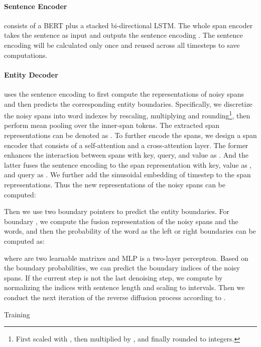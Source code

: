 \documentclass[11pt]{article}
\begin{document}
\paragraph{Sentence Encoder} consists of a BERT \citep{devlin-etal-2019-bert} plus a stacked bi-directional LSTM. The whole span encoder takes the sentence  as input and outputs the sentence encoding . The sentence encoding  will be calculated only once and reused across all timesteps to save computations.




\paragraph{Entity Decoder} uses the sentence encoding  to first compute the representations of  noisy spans  and then predicts the corresponding entity boundaries.
Specifically, we discretize the noisy spans into word indexes by rescaling, multiplying and rounding\footnote{\;First scaled with , then multiplied by , and finally rounded to integers.}, then perform mean pooling over the inner-span tokens. The extracted span representations can be denoted as . 
To further encode the spans, we design a span encoder that consists of a self-attention and a cross-attention layer. The former enhances the interaction between spans with key, query, and value as .  And the latter fuses the sentence encoding to the span representation with key, value as , and query as . 
We further add the sinusoidal embedding  \citep{NIPS2017_3f5ee243} of timestep  to the span representations. 
Thus the new representations  of the noisy spans can be computed:

Then we use two boundary pointers to predict the entity boundaries. For boundary , we compute the fusion representation  of the noisy spans and the words, and then the probability of the word as the left or right boundaries  can be computed as:

where  are two learnable matrixes and MLP is a two-layer perceptron. Based on the boundary probabilities, we can predict the boundary indices of the  noisy spans.
If the current step is not the last denoising step, we compute  by normalizing the indices with sentence length  and scaling to  intervals. Then we conduct the next iteration of the reverse diffusion process according to .


\begin{algorithm}[t]
\small
 \caption{Training}
 \label{alg:training}
\end{algorithm}
\end{document}
